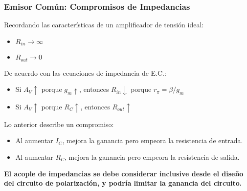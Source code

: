 \begin{frame}[t]
    \frametitle{Emisor Común: Compromisos de Impedancias}

    Recordando las características de un amplificador de tensión ideal:

    \begin{itemize}
        \item $R_{in} \rightarrow \infty$
        \item $R_{out} \rightarrow 0$
    \end{itemize}

    \vspace{5mm}
    De acuerdo con las ecuaciones de impedancia de E.C.:

    \begin{itemize}
        \item Si $A_V \uparrow$ porque $g_m \uparrow$, entonces $R_{in} \downarrow$ porque $r_\pi = \beta / g_m$
        \item Si $A_V \uparrow$ porque $R_C \uparrow$, entonces $R_{out} \uparrow$
    \end{itemize}

    \vspace{5mm}
    Lo anterior describe un compromiso:
    
    \begin{itemize}
        \item Al aumentar $I_C$, mejora la ganancia pero empeora la resistencia de entrada.
        \item Al aumentar $R_C$, mejora la ganancia pero empeora la resistencia de salida. 
    \end{itemize} 

    \vspace{5mm}
    \centering \textbf{El acople de impedancias se debe considerar inclusive desde el diseño del circuito de polarización, y podría limitar la ganancia del circuito.}
\end{frame}


